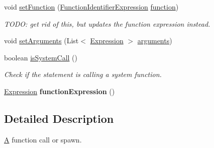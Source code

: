 \begin{DoxyCompactItemize}
\item 
void \hyperlink{interfaceedu_1_1udel_1_1cis_1_1vsl_1_1civl_1_1model_1_1IF_1_1statement_1_1CallOrSpawnStatement_a0b9e77fecdfc04b2a18ce8d07c0d50c5}{set\+Function} (\hyperlink{interfaceedu_1_1udel_1_1cis_1_1vsl_1_1civl_1_1model_1_1IF_1_1expression_1_1FunctionIdentifierExpression}{Function\+Identifier\+Expression} \hyperlink{interfaceedu_1_1udel_1_1cis_1_1vsl_1_1civl_1_1model_1_1IF_1_1statement_1_1CallOrSpawnStatement_ae7f9af5b547634bb2894e21875ab22a2}{function})
\begin{DoxyCompactList}\small\item\em T\+O\+D\+O\+: get rid of this, but updates the function expression instead. \end{DoxyCompactList}\item 
void \hyperlink{interfaceedu_1_1udel_1_1cis_1_1vsl_1_1civl_1_1model_1_1IF_1_1statement_1_1CallOrSpawnStatement_aa6b514d6ff56f73ebaa95794f5a9ba09}{set\+Arguments} (List$<$ \hyperlink{interfaceedu_1_1udel_1_1cis_1_1vsl_1_1civl_1_1model_1_1IF_1_1expression_1_1Expression}{Expression} $>$ \hyperlink{interfaceedu_1_1udel_1_1cis_1_1vsl_1_1civl_1_1model_1_1IF_1_1statement_1_1CallOrSpawnStatement_acd526acdc6b8651aa60ddcf1db40a92c}{arguments})
\item 
boolean \hyperlink{interfaceedu_1_1udel_1_1cis_1_1vsl_1_1civl_1_1model_1_1IF_1_1statement_1_1CallOrSpawnStatement_a0fc135bbaae85b44327fc89adb2af808}{is\+System\+Call} ()
\begin{DoxyCompactList}\small\item\em Check if the statement is calling a system function. \end{DoxyCompactList}\item 
\hypertarget{interfaceedu_1_1udel_1_1cis_1_1vsl_1_1civl_1_1model_1_1IF_1_1statement_1_1CallOrSpawnStatement_a4ce41ed79ac5f7a7e1e315c4c300f878}{}\hyperlink{interfaceedu_1_1udel_1_1cis_1_1vsl_1_1civl_1_1model_1_1IF_1_1expression_1_1Expression}{Expression} {\bfseries function\+Expression} ()\label{interfaceedu_1_1udel_1_1cis_1_1vsl_1_1civl_1_1model_1_1IF_1_1statement_1_1CallOrSpawnStatement_a4ce41ed79ac5f7a7e1e315c4c300f878}

\end{DoxyCompactItemize}


\subsection{Detailed Description}
\hyperlink{structA}{A} function call or spawn. 

